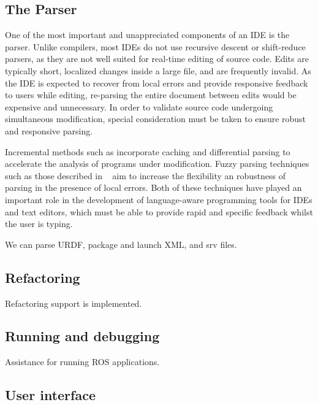 \documentclass[12pt,initial,twoside,maitrise]{dms}
\numberwithin{equation}{section}
\numberwithin{table}{chapter}
\numberwithin{figure}{chapter}
\begin{document}
\subsection{The Parser}\label{subsec:the-parser}

One of the most important and unappreciated components of an IDE is the parser. Unlike compilers, most IDEs do not use recursive descent or shift-reduce parsers, as they are not well suited for real-time editing of source code. Edits are typically short, localized changes inside a large file, and are frequently invalid. As the IDE is expected to recover from local errors and provide responsive feedback to users while editing, re-parsing the entire document between edits would be expensive and unnecessary. In order to validate source code undergoing simultaneous modification, special consideration must be taken to ensure robust and responsive parsing.

Incremental methods such as \citet{wagner1997practical,wagner1997incremental} incorporate caching and differential parsing to accelerate the analysis of programs under modification. Fuzzy parsing techniques such as those described in ~\citet{koppler1997systematic} aim to increase the flexibility an robustness of parsing in the presence of local errors. Both of these techniques have played an important role in the development of language-aware programming tools for IDEs and text editors, which must be able to provide rapid and specific feedback whilst the user is typing.

We can parse URDF, package and launch XML, and srv files.

\subsection{Refactoring}\label{subsec:refactoring}

Refactoring support is implemented.

\subsection{Running and debugging}

Assistance for running ROS applications.

\subsection{User interface}
\end{document}
